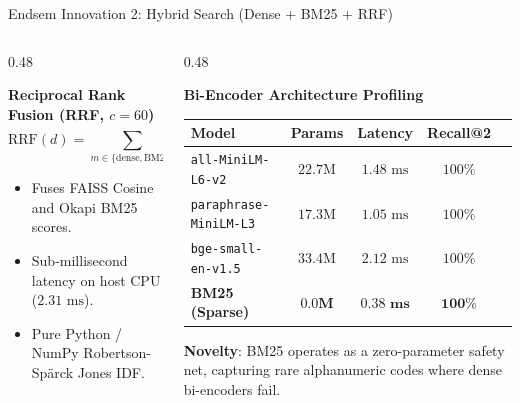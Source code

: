 \documentclass[10pt,aspectratio=169]{beamer}
\begin{document}
\begin{frame}{Endsem Innovation 2: Hybrid Search (Dense + BM25 + RRF)}
    \begin{columns}[onlytextwidth,T]
        \begin{column}{0.48\textwidth}
            \begin{block}{\textbf{Reciprocal Rank Fusion (RRF, $c=60$)}}
                $$\text{RRF}(d) = \sum_{m \in \{\text{dense}, \text{BM25}\}} \frac{1}{60 + \text{rank}_m(d)}$$
                \begin{itemize}\setlength\itemsep{2pt}
                    \item Fuses FAISS Cosine and Okapi BM25 scores.
                    \item Sub-millisecond latency on host CPU ($2.31\text{ ms}$).
                    \item Pure Python / NumPy Robertson-Spärck Jones IDF.
                \end{itemize}
            \end{block}
        \end{column}
        
        \begin{column}{0.48\textwidth}
            \begin{block}{\textbf{Bi-Encoder Architecture Profiling}}
                \scriptsize
                \begin{tabular}{lcccc}
                    \toprule
                    \textbf{Model} & \textbf{Params} & \textbf{Latency} & \textbf{Recall@2} \\
                    \midrule
                    \texttt{all-MiniLM-L6-v2} & $22.7\text{M}$ & $1.48\text{ ms}$ & $100\%$ \\
                    \texttt{paraphrase-MiniLM-L3} & $17.3\text{M}$ & $1.05\text{ ms}$ & $100\%$ \\
                    \texttt{bge-small-en-v1.5} & $33.4\text{M}$ & $2.12\text{ ms}$ & $100\%$ \\
                    \textbf{BM25 (Sparse)} & $\mathbf{0.0\text{M}}$ & $\mathbf{0.38\text{ ms}}$ & $\mathbf{100\%}$ \\
                    \bottomrule
                \end{tabular}
            \end{block}
            \vspace{-0.1cm}
            \scriptsize \textbf{Novelty}: BM25 operates as a zero-parameter safety net, capturing rare alphanumeric codes where dense bi-encoders fail.
        \end{column}
    \end{columns}
\end{frame}
\end{document}
